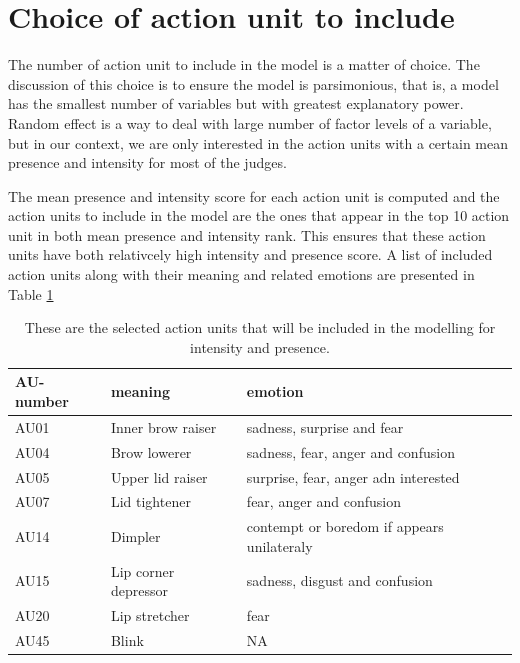 \documentclass{monashthesis}
\begin{document}
\let\cleardoublepage\clearpage

\newpage

\hypertarget{choice-of-action-unit-to-include}{%
\section{Choice of action unit to include}\label{choice-of-action-unit-to-include}}

The number of action unit to include in the model is a matter of choice. The discussion of this choice is to ensure the model is parsimonious, that is, a model has the smallest number of variables but with greatest explanatory power. Random effect is a way to deal with large number of factor levels of a variable, but in our context, we are only interested in the action units with a certain mean presence and intensity for most of the judges.

The mean presence and intensity score for each action unit is computed and the action units to include in the model are the ones that appear in the top 10 action unit in both mean presence and intensity rank. This ensures that these action units have both relativcely high intensity and presence score. A list of included action units along with their meaning and related emotions are presented in Table \ref{tab:au-included}

\begin{table}[ht]
\begin{center}
\caption{\label{tab:au-included} These are the selected action units that will be included in the modelling for intensity and presence.}
\begin{tabular}{lll}
\toprule
AU-number & meaning & emotion \\
\midrule
AU01 & Inner brow raiser & sadness, surprise and fear \\
AU04 & Brow lowerer & sadness, fear, anger and confusion \\
AU05 & Upper lid raiser & surprise, fear, anger adn interested \\
AU07 & Lid tightener & fear, anger and confusion \\
AU14 & Dimpler & contempt or boredom if appears unilateraly \\
AU15 & Lip corner depressor & sadness, disgust and confusion \\
AU20 & Lip stretcher & fear \\
AU45 & Blink & NA \\
\bottomrule
\end{tabular}
\end{center}
\end{table}
\end{document}
